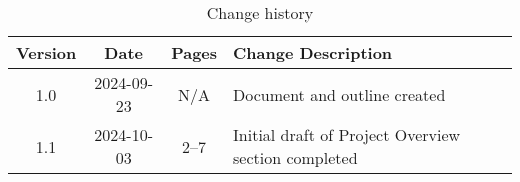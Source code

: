 \usepackage{tabularx}
\usepackage{lastpage}

\makeatletter
\begin{table}[!h]
\centering
\caption{Change history}
\label{tab:change-history}
\begin{tabularx}{\textwidth}{|c|c|c|X|}
\hline
\textbf{Version} & \textbf{Date} & \textbf{Pages} & \textbf{Change Description} \\ 
\hline
1.0 & 2024-09-23 & N/A & Document and outline created \\ 
\hline
1.1 & 2024-10-03 & 2--7 & Initial draft of Project Overview section completed \\ 
\hline
\end{tabularx}
\end{table}
\makeatother
